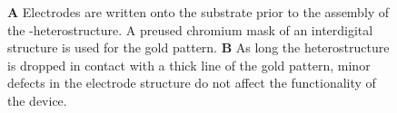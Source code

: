 \begin{figure}
\begin{subfigure}{0.4\textwidth}
\end{subfigure}
\begin{subfigure}{0.4\textwidth}
	\caption{}
\end{subfigure}
\caption{\textbf{A} Electrodes are written onto the substrate prior to the assembly of the \hbn-\tmdg heterostructure. A preused chromium mask of an interdigital structure is used for the gold pattern. \textbf{B} As long the heterostructure is dropped in contact with a thick line of the gold pattern, minor defects in the electrode structure do not affect the functionality of the device.}
	\label{pattern}
\end{figure}

